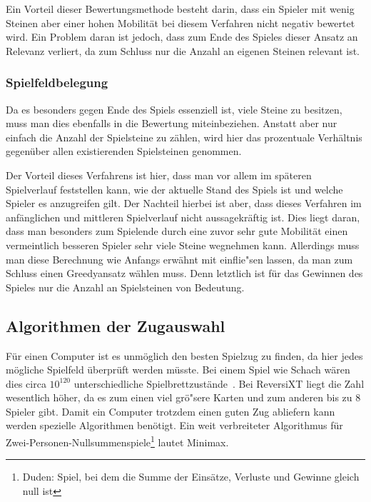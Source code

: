 Ein Vorteil dieser Bewertungsmethode besteht darin, dass ein Spieler mit wenig Steinen aber einer hohen Mobilit\"at bei diesem Verfahren nicht negativ bewertet wird.
Ein Problem daran ist jedoch, dass zum Ende des Spieles dieser Ansatz an Relevanz verliert, da zum Schluss nur die Anzahl an eigenen Steinen relevant ist.

\subsubsection{Spielfeldbelegung}\label{subsubsec:spielfeldbelegung}
Da es besonders gegen Ende des Spiels essenziell ist, viele Steine zu besitzen, muss man dies ebenfalls in die Bewertung miteinbeziehen.
Anstatt aber nur einfach die Anzahl der Spielsteine zu z\"ahlen, wird hier das prozentuale Verh\"altnis gegen\"uber allen existierenden Spielsteinen genommen.

Der Vorteil dieses Verfahrens ist hier, dass man vor allem im sp\"ateren Spielverlauf feststellen kann, wie der aktuelle Stand des Spiels ist und welche Spieler es anzugreifen gilt.
Der Nachteil hierbei ist aber, dass dieses Verfahren im anf\"anglichen und mittleren Spielverlauf nicht aussagekr\"aftig ist.
Dies liegt daran, dass man besonders zum Spielende durch eine zuvor sehr gute Mobilit\"at einen vermeintlich besseren Spieler sehr viele Steine wegnehmen kann.
Allerdings muss man diese Berechnung wie Anfangs erw\"ahnt mit einflie"sen lassen, da man zum Schluss einen Greedyansatz w\"ahlen muss.
Denn letztlich ist f\"ur das Gewinnen des Spieles nur die Anzahl an Spielsteinen von Bedeutung.

\subsection{Algorithmen der Zugauswahl}\label{subsec:algorithmen-der-zugauswahl}
F\"ur einen Computer ist es unm\"oglich den besten Spielzug zu finden, da hier jedes m\"ogliche Spielfeld \"uberpr\"uft werden m\"usste.
Bei einem Spiel wie Schach w\"aren dies circa $10^{120}$ unterschiedliche Spielbrettzust\"ande~\cite{chessBoards}.
Bei ReversiXT liegt die Zahl wesentlich h\"oher, da es zum einen viel gr\"o"sere Karten und zum anderen bis zu 8 Spieler gibt.
Damit ein Computer trotzdem einen guten Zug abliefern kann werden spezielle Algorithmen ben\"otigt.
Ein weit verbreiteter Algorithmus f\"ur Zwei-Personen-Nullsummenspiele\footnote{Duden: Spiel, bei dem die Summe der Einsätze, Verluste und Gewinne gleich null ist} lautet Minimax.

